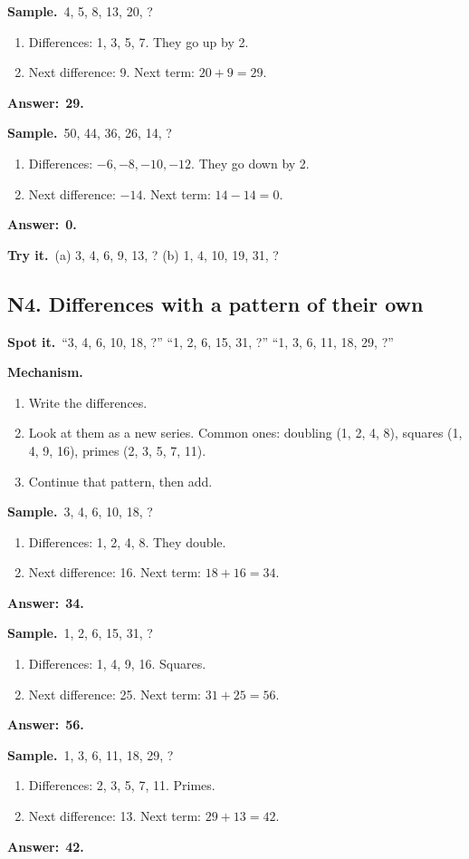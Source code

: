 \documentclass[11pt,a4paper]{article}
\let\oldsubsection\subsection
\renewcommand{\subsection}{\needspace{9\baselineskip}\oldsubsection}
\newcommand{\spot}{\textbf{\color{ember}Spot it.}\ }
\newcommand{\mech}{\textbf{\color{ember}Mechanism.}\ }
\newif\ifkeepsamp
\newcommand{\ans}[1]{\par\nopagebreak\noindent\textbf{\color{ember}Answer:}\ \textbf{#1}\par}
\newcommand{\samp}{\ifkeepsamp\needspace{4\baselineskip}\fi\textbf{\color{ember}Sample.}\ }
\newcommand{\tryit}[1]{\textbf{\color{ember}Try it.}\ #1}
\begin{document}
\samp 4, 5, 8, 13, 20, ?
\begin{enumerate}
\item Differences: 1, 3, 5, 7. They go up by 2.
\item Next difference: 9. Next term: $20 + 9 = 29$.
\end{enumerate}
\ans{29.}

\samp 50, 44, 36, 26, 14, ?
\begin{enumerate}
\item Differences: $-6, -8, -10, -12$. They go down by 2.
\item Next difference: $-14$. Next term: $14 - 14 = 0$.
\end{enumerate}
\ans{0.}

\tryit (a) 3, 4, 6, 9, 13, ? (b) 1, 4, 10, 19, 31, ?

\subsection{N4. Differences with a pattern of their own}
\spot ``3, 4, 6, 10, 18, ?'' ``1, 2, 6, 15, 31, ?'' ``1, 3, 6, 11, 18, 29, ?''

\mech
\begin{enumerate}
\item Write the differences.
\item Look at them as a new series. Common ones: doubling (1, 2, 4, 8), squares (1, 4, 9, 16), primes (2, 3, 5, 7, 11).
\item Continue that pattern, then add.
\end{enumerate}

\samp 3, 4, 6, 10, 18, ?
\begin{enumerate}
\item Differences: 1, 2, 4, 8. They double.
\item Next difference: 16. Next term: $18 + 16 = 34$.
\end{enumerate}
\ans{34.}

\samp 1, 2, 6, 15, 31, ?
\begin{enumerate}
\item Differences: 1, 4, 9, 16. Squares.
\item Next difference: 25. Next term: $31 + 25 = 56$.
\end{enumerate}
\ans{56.}

\samp 1, 3, 6, 11, 18, 29, ?
\begin{enumerate}
\item Differences: 2, 3, 5, 7, 11. Primes.
\item Next difference: 13. Next term: $29 + 13 = 42$.
\end{enumerate}
\ans{42.}
\end{document}
